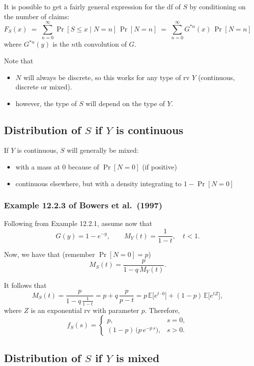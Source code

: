 \documentclass[11pt]{article}
\newcommand{\noi}{\noindent}
\begin{document}
\noi It is possible to get a fairly general expression for the df of \(S\) by conditioning on the number of claims:
\[
F_S(x)
\;=\;
\sum_{n=0}^{\infty}\Pr[S \le x\mid N = n]\,\Pr[N = n]
\;=\;
\sum_{n=0}^{\infty}G^{*n}(x)\,\Pr[N = n]
\tag{1}
\]
\noi where \(G^{*n}(y)\) is the \(n\)th convolution of \(G\).  

\noi Note that
\begin{itemize}
  \item \(N\) will always be discrete, so this works for any type of rv \(Y\) (continuous, discrete or mixed).
  \item however, the type of \(S\) will depend on the type of \(Y\).
\end{itemize}


\subsection{Distribution of \(S\) if \(Y\) is continuous}

\noi If \(Y\) is continuous, \(S\) will generally be mixed:
\begin{itemize}
  \item with a mass at \(0\) because of \(\Pr[N=0]\) (if positive)
  \item continuous elsewhere, but with a density integrating to \(1 - \Pr[N=0]\)
\end{itemize}


\subsubsection{Example 12.2.3 of Bowers et al.\ (1997)}

\noi Following from Example 12.2.1, assume now that
\[
G(y) = 1 - e^{-y},
\qquad
M_Y(t) = \frac{1}{1 - t},\quad t < 1.
\]

\noi Now, we have that (remember \(\Pr[N=0]=p\))
\[
M_S(t)
= \frac{p}{1 - q\,M_Y(t)}.
\]

\noi It follows that
\[
M_S(t)
= \frac{p}{1 - q\,\frac{1}{1-t}}
= p + q\,\frac{p}{p - t}
= p\,\mathbb{E}\bigl[e^{t\cdot 0}\bigr]
  + (1-p)\,\mathbb{E}\bigl[e^{tZ}\bigr],
\]
where \(Z\) is an exponential rv with parameter \(p\).  Therefore,
\[
f_S(s)
=
\begin{cases}
p, & s = 0,\\[0.4em]
(1-p)\,\bigl(p\,e^{-p\,s}\bigr), & s > 0.
\end{cases}
\]


\subsection{Distribution of \(S\) if \(Y\) is mixed}
\end{document}
